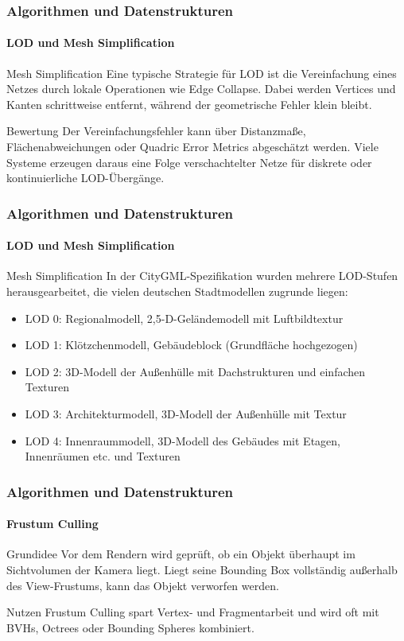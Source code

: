\documentclass{beamer}
\begin{document}
\begin{frame}
    \frametitle{Algorithmen und Datenstrukturen}
    \framesubtitle{LOD und Mesh Simplification}
    \small
    \begin{block}{Mesh Simplification}
    Eine typische Strategie f\"ur LOD ist die Vereinfachung eines Netzes durch
    lokale Operationen wie Edge Collapse. Dabei werden Vertices und Kanten
    schrittweise entfernt, w\"ahrend der geometrische Fehler klein bleibt.
    \end{block}

    \begin{block}{Bewertung}
    Der Vereinfachungsfehler kann \"uber Distanzma{\ss}e, Fl\"achenabweichungen
    oder Quadric Error Metrics abgesch\"atzt werden. Viele Systeme erzeugen
    daraus eine Folge verschachtelter Netze f\"ur diskrete oder kontinuierliche
    LOD-\"Uberg\"ange.
    \end{block}
\end{frame}

\begin{frame}
    \frametitle{Algorithmen und Datenstrukturen}
    \framesubtitle{LOD und Mesh Simplification}
    \small
    \begin{block}{Mesh Simplification}
    In der CityGML-Spezifikation wurden mehrere LOD-Stufen
    herausgearbeitet, die vielen deutschen Stadtmodellen zugrunde liegen:

    \begin{itemize}
        \item LOD 0: Regionalmodell, 2,5-D-Geländemodell mit Luftbildtextur
        \item LOD 1: Klötzchenmodell, Gebäudeblock (Grundfläche hochgezogen)
        \item LOD 2: 3D-Modell der Außenhülle mit Dachstrukturen und einfachen Texturen
        \item LOD 3: Architekturmodell, 3D-Modell der Außenhülle mit Textur
        \item LOD 4: Innenraummodell, 3D-Modell des Gebäudes mit Etagen, Innenräumen etc. und Texturen
    \end{itemize}

    \end{block}


\end{frame}



\begin{frame}
    \frametitle{Algorithmen und Datenstrukturen}
    \framesubtitle{Frustum Culling}
    \small
    \begin{block}{Grundidee}
    Vor dem Rendern wird gepr\"uft, ob ein Objekt \"uberhaupt im Sichtvolumen
    der Kamera liegt. Liegt seine Bounding Box vollst\"andig au{\ss}erhalb des
    View-Frustums, kann das Objekt verworfen werden.
    \end{block}

    \begin{block}{Nutzen}
    Frustum Culling spart Vertex- und Fragmentarbeit und wird oft mit BVHs,
    Octrees oder Bounding Spheres kombiniert.
    \end{block}
\end{frame}
\end{document}
